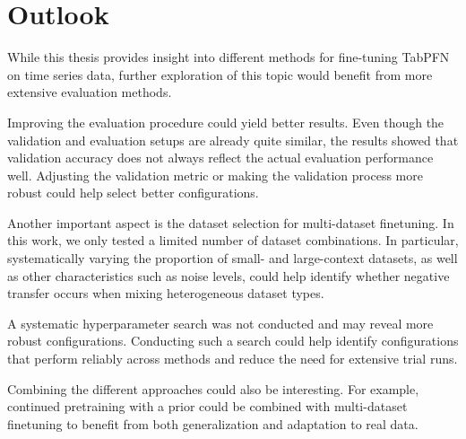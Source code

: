 \section{Outlook}
While this thesis provides insight into different methods for fine-tuning TabPFN on time series data, further exploration of this topic would benefit from more extensive evaluation methods.

Improving the evaluation procedure could yield better results.
Even though the validation and evaluation setups are already quite similar, the results showed that validation accuracy does not always reflect the actual evaluation performance well.
Adjusting the validation metric or making the validation process more robust could help select better configurations.

Another important aspect is the dataset selection for multi-dataset finetuning.
In this work, we only tested a limited number of dataset combinations.
In particular, systematically varying the proportion of small- and large-context datasets, as well as other characteristics such as noise levels, could help identify whether negative transfer occurs when mixing heterogeneous dataset types.

A systematic hyperparameter search was not conducted and may reveal more robust configurations.
Conducting such a search could help identify configurations that perform reliably across methods and reduce the need for extensive trial runs.

Combining the different approaches could also be interesting.
For example, continued pretraining with a prior could be combined with multi-dataset finetuning to benefit from both generalization and adaptation to real data.

